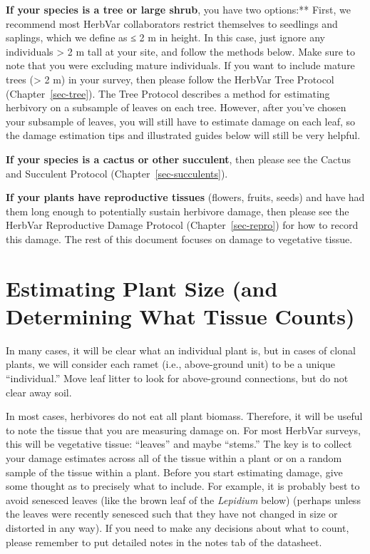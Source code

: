 \documentclass[
  letterpaper,
  oneside,
  open=any]{scrbook}
\begin{document}
\textbf{If your species is a tree or large shrub}, you have two
options:** First, we recommend most HerbVar collaborators restrict
themselves to seedlings and saplings, which we define as ≤ 2 m in
height. In this case, just ignore any individuals \textgreater{} 2 m
tall at your site, and follow the methods below. Make sure to note that
you were excluding mature individuals. If you want to include mature
trees (\textgreater{} 2 m) in your survey, then please follow the
HerbVar Tree Protocol (Chapter~\ref{sec-tree}). The Tree Protocol
describes a method for estimating herbivory on a subsample of leaves on
each tree. However, after you've chosen your subsample of leaves, you
will still have to estimate damage on each leaf, so the damage
estimation tips and illustrated guides below will still be very helpful.

\textbf{If your species is a cactus or other succulent}, then please see
the Cactus and Succulent Protocol (Chapter~\ref{sec-succulents}).

\textbf{If your plants have reproductive tissues} (flowers, fruits,
seeds) and have had them long enough to potentially sustain herbivore
damage, then please see the HerbVar Reproductive Damage Protocol
(Chapter~\ref{sec-repro}) for how to record this damage. The rest of
this document focuses on damage to vegetative tissue.

\section{Estimating Plant Size (and Determining What Tissue
Counts)}\label{estimating-plant-size-and-determining-what-tissue-counts}

In many cases, it will be clear what an individual plant is, but in
cases of clonal plants, we will consider each ramet (i.e., above-ground
unit) to be a unique ``individual.'' Move leaf litter to look for
above-ground connections, but do not clear away soil.

In most cases, herbivores do not eat all plant biomass. Therefore, it
will be useful to note the tissue that you are measuring damage on. For
most HerbVar surveys, this will be vegetative tissue: ``leaves'' and
maybe ``stems.'' The key is to collect your damage estimates across all
of the tissue within a plant or on a random sample of the tissue within
a plant. Before you start estimating damage, give some thought as to
precisely what to include. For example, it is probably best to avoid
senesced leaves (like the brown leaf of the \emph{Lepidium} below)
(perhaps unless the leaves were recently senesced such that they have
not changed in size or distorted in any way). If you need to make any
decisions about what to count, please remember to put detailed notes in
the notes tab of the datasheet.
\end{document}
